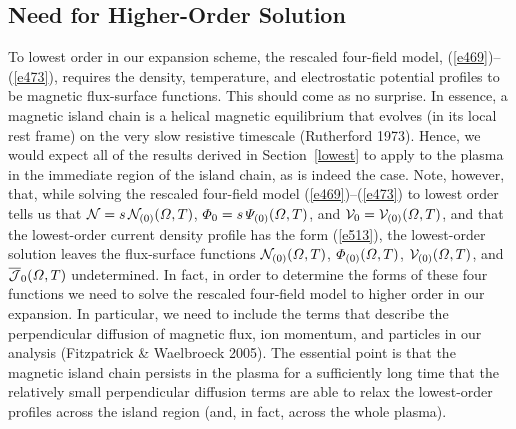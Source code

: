 \documentclass[notitlepage,12pt]{article}
\begin{document}
\subsection{Need for Higher-Order Solution}
To lowest order in our expansion scheme, the rescaled four-field model, (\ref{e469})--(\ref{e473}), requires the density, temperature, and  
electrostatic potential profiles to be magnetic flux-surface functions. This should come as no surprise. In essence,
a magnetic island chain is a helical magnetic equilibrium that evolves (in its local rest frame) on the very
slow resistive timescale (Rutherford 1973). Hence, we would expect all of the results derived in Section~\ref{lowest}
to apply to the plasma in the immediate region of the island chain, as is indeed the case. Note, however, that, 
while solving the  rescaled four-field model (\ref{e469})--(\ref{e473}) to lowest order  tells us that
${\cal N}=s\,{\cal N}_{(0)}({\mit\Omega},T)$, ${\mit\Phi}_0 =s\,{\mit\Psi}_{(0)}({\mit\Omega},T)$, and
${\cal V}_0 = {\cal V}_{(0)}({\mit\Omega},T)$, and that the lowest-order current density profile has the form (\ref{e513}), the lowest-order solution leaves the  flux-surface functions ${\cal N}_{(0)}({\mit\Omega},T)$,
${\mit\Phi}_{(0)}({\mit\Omega},T)$,  ${\cal V}_{(0)}({\mit\Omega},T)$, and $\overline{\cal J}_0({\mit\Omega},T)$ undetermined. In fact, in order to determine
the forms of these  four  functions we need to solve the rescaled four-field model to higher order in our expansion. In particular,
we need to include the terms that describe the perpendicular diffusion of magnetic flux, ion momentum, and
particles in our analysis (Fitzpatrick \& Waelbroeck 2005). The essential point is that the magnetic island
chain persists in the plasma for a sufficiently long time that  the relatively small perpendicular diffusion
terms are able to relax the lowest-order profiles across the island region (and, in fact, across the whole plasma). 
\end{document}
